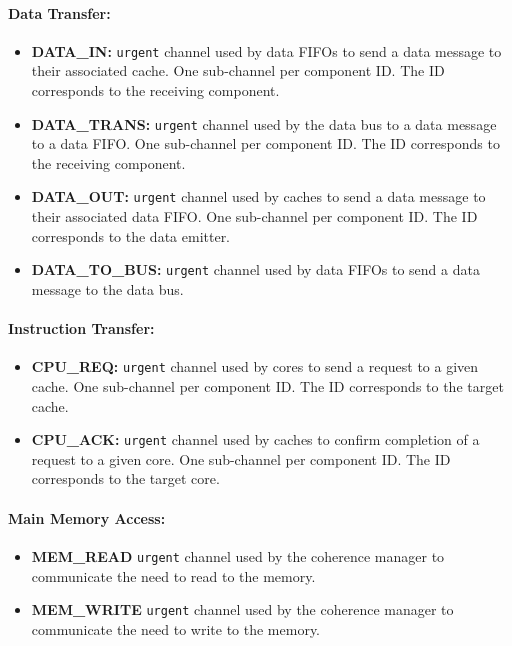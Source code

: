 \paragraph{Data Transfer:}
\begin{itemize}
\item \textbf{DATA\_IN:}
   \texttt{urgent} channel used by data FIFOs to send a data message to their
   associated cache. One sub-channel per component ID. The ID corresponds to the
   receiving component.

\item \textbf{DATA\_TRANS:}
   \texttt{urgent} channel used by the data bus to a data message to a data
   FIFO. One sub-channel per component ID. The ID corresponds to the receiving
   component.

\item \textbf{DATA\_OUT:}
   \texttt{urgent} channel used by caches to send a data message to their
   associated data FIFO. One sub-channel per component ID. The ID corresponds to
   the data emitter.

\item \textbf{DATA\_TO\_BUS:}
   \texttt{urgent} channel used by data FIFOs to send a data message to the
   data bus.
\end{itemize}

\paragraph{Instruction Transfer:}
\begin{itemize}
\item \textbf{CPU\_REQ:}
   \texttt{urgent} channel used by cores to send a request to a given cache.
   One sub-channel per component ID. The ID corresponds to the target cache.

\item \textbf{CPU\_ACK:}
   \texttt{urgent} channel used by caches to confirm completion of a request to
   a given core. One sub-channel per component ID. The ID corresponds to the
   target core.
\end{itemize}

\paragraph{Main Memory Access:}
\begin{itemize}
\item \textbf{MEM\_READ}
   \texttt{urgent} channel used by the coherence manager to communicate the
   need to read to the memory.

\item \textbf{MEM\_WRITE}
   \texttt{urgent} channel used by the coherence manager to communicate the
   need to write to the memory.
\end{itemize}


